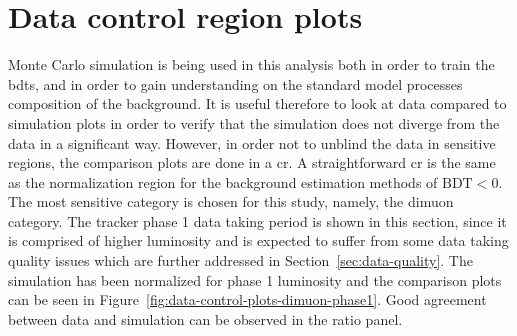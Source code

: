 \clearpage
\section{Data control region plots}
\label{sec:data-control-region-plots}

Monte Carlo simulation is being used in this analysis both in order to train the \glspl{bdt}, and in order to gain understanding on the standard model processes composition of the background. It is useful therefore to look at data compared to simulation plots in order to verify that the simulation does not diverge from the data in a significant way. However, in order not to unblind the data in sensitive regions, the comparison plots are done in a \gls{cr}. A straightforward \gls{cr} is the same as the normalization region for the background estimation methods of $\text{BDT} < 0$. The most sensitive category is chosen for this study, namely, the dimuon category. The tracker phase 1 data taking period is shown in this section, since it is comprised of higher luminosity and is expected to suffer from some data taking quality issues which are further addressed in Section~\ref{sec:data-quality}. The simulation has been normalized for phase 1 luminosity and the comparison plots can be seen in Figure~\ref{fig:data-control-plots-dimuon-phase1}. Good agreement between data and simulation can be observed in the ratio panel.


